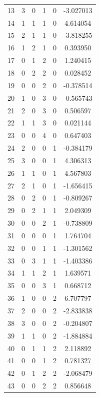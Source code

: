 \documentclass[preprint,12pt]{elsarticle}
\begin{document}
\begin{table}
\begin{minipage}[h!]{0.23\textwidth}
{\begin{tabular}{|c|ccccc|}
13 &   3 &   0 &   1 &   0 &   -3.027013 \\
14 &   1 &   1 &   1 &   0 &    4.614054 \\
15 &   2 &   1 &   1 &   0 &   -3.818255 \\
16 &   1 &   2 &   1 &   0 &    0.393950 \\
17 &   0 &   1 &   2 &   0 &    1.240415 \\
18 &   0 &   2 &   2 &   0 &    0.028452 \\
19 &   0 &   0 &   2 &   0 &   -0.378514 \\
20 &   1 &   0 &   3 &   0 &   -0.565743 \\
21 &   2 &   0 &   3 &   0 &    0.506597 \\
22 &   1 &   1 &   3 &   0 &    0.021144 \\
23 &   0 &   0 &   4 &   0 &    0.647403 \\
24 &   2 &   0 &   0 &   1 &   -0.384179 \\
25 &   3 &   0 &   0 &   1 &    4.306313 \\
26 &   1 &   1 &   0 &   1 &    4.567803 \\
27 &   2 &   1 &   0 &   1 &   -1.656415 \\
28 &   0 &   2 &   0 &   1 &   -0.809267 \\
29 &   0 &   2 &   1 &   1 &    2.049309 \\
30 &   0 &   0 &   2 &   1 &   -0.738809 \\
31 &   0 &   0 &   0 &   1 &    1.764704 \\
32 &   0 &   0 &   1 &   1 &   -1.301562 \\
33 &   0 &   3 &   1 &   1 &   -1.403386 \\
34 &   1 &   1 &   2 &   1 &    1.639571 \\
35 &   0 &   0 &   3 &   1 &    0.668712 \\
36 &   1 &   0 &   0 &   2 &    6.707797 \\
37 &   2 &   0 &   0 &   2 &   -2.833838 \\
38 &   3 &   0 &   0 &   2 &   -0.204807 \\
39 &   1 &   1 &   0 &   2 &   -1.884884 \\
40 &   0 &   1 &   1 &   2 &    2.118892 \\
41 &   0 &   0 &   1 &   2 &    0.781327 \\
42 &   0 &   1 &   2 &   2 &   -2.068479 \\
43 &   0 &   0 &   2 &   2 &    0.856648 \\

\end{tabular}}
\end{minipage}
\end{table}
\end{document}
